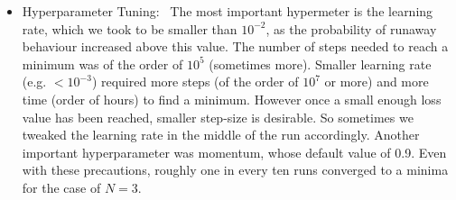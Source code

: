 \documentclass[12pt,a4paper]{JHEP3}
\begin{document}
\begin{itemize}

\item
Hyperparameter Tuning: \,  
The most important hypermeter is the learning rate, which we took to be smaller than $10^{-2}$, as the probability of runaway behaviour increased above this value. The number of steps needed to reach a minimum was of the order of $10^5$ (sometimes more). Smaller learning rate (e.g. $< 10^{-3}$) required more steps (of the order of $10^7$ or more) and more time (order of hours) to find a minimum. However once a small enough loss value has been reached, smaller step-size is desirable. So sometimes we tweaked the learning rate in the middle of the run accordingly. %
Another important hyperparameter was momentum, whose default value of 0.9. Even with these precautions, roughly one in every ten runs converged to a minima for the case of $N=3$.

%
%
%
%


\end{itemize}
\end{document}
